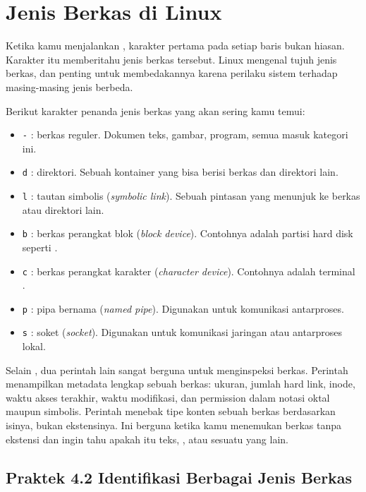\section{Jenis Berkas di Linux}
\label{sec:filetypes}

Ketika kamu menjalankan , karakter pertama pada setiap baris bukan hiasan.
Karakter itu memberitahu jenis berkas tersebut. Linux mengenal tujuh jenis berkas, dan
penting untuk membedakannya karena perilaku sistem terhadap masing-masing jenis berbeda.

Berikut karakter penanda jenis berkas yang akan sering kamu temui:

\begin{itemize}
    \item \texttt{-} : berkas reguler. Dokumen teks, gambar,  program, semua masuk kategori ini.
    \item \texttt{d} : direktori. Sebuah kontainer yang bisa berisi berkas dan direktori lain.
    \item \texttt{l} : tautan simbolis (\textit{symbolic link}). Sebuah pintasan yang menunjuk ke berkas atau direktori lain.
    \item \texttt{b} : berkas perangkat blok (\textit{block device}). Contohnya adalah partisi hard disk seperti .
    \item \texttt{c} : berkas perangkat karakter (\textit{character device}). Contohnya adalah terminal .
    \item \texttt{p} : pipa bernama (\textit{named pipe}). Digunakan untuk komunikasi antarproses.
    \item \texttt{s} : soket (\textit{socket}). Digunakan untuk komunikasi jaringan atau antarproses lokal.
\end{itemize}

Selain , dua perintah lain sangat berguna untuk menginspeksi berkas. Perintah
 menampilkan metadata lengkap sebuah berkas: ukuran, jumlah hard link, inode,
waktu akses terakhir, waktu modifikasi, dan permission dalam notasi oktal maupun simbolis.
Perintah  menebak tipe konten sebuah berkas berdasarkan isinya, bukan ekstensinya.
Ini berguna ketika kamu menemukan berkas tanpa ekstensi dan ingin tahu apakah itu teks,
, atau sesuatu yang lain.

\subsection*{Praktek 4.2 Identifikasi Berbagai Jenis Berkas}

